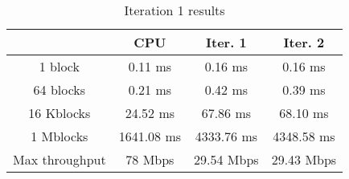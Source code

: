 \begin{table}
	\caption{Iteration 1 results}
	\centering
	\begin{tabular}{cccc}
		\toprule
		 & CPU & Iter. 1 & Iter. 2 \\
		\midrule
		1 block & 0.11 ms & 0.16 ms & 0.16 ms \\
		64 blocks & 0.21 ms & 0.42 ms & 0.39 ms \\
		16 Kblocks & 24.52 ms & 67.86 ms & 68.10 ms \\
		1 Mblocks & 1641.08 ms & 4333.76 ms & 4348.58 ms \\
		Max throughput & 78 Mbps & 29.54 Mbps & 29.43 Mbps \\
		\bottomrule
	\end{tabular}
\end{table}
